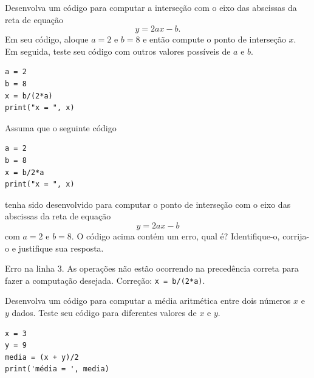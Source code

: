 \begin{exer}
  Desenvolva um código {\python} para computar a interseção com o eixo das abscissas da reta de equação
  \begin{equation}
    y =  2ax - b.
  \end{equation}
  Em seu código, aloque $a=2$ e $b=8$ e então compute o ponto de interseção $x$. Em seguida, teste seu código com outros valores possíveis de $a$ e $b$.
\end{exer}
\begin{resp}

\begin{lstlisting}
a = 2
b = 8
x = b/(2*a)
print("x = ", x)
\end{lstlisting}

\end{resp}

\begin{exer}
  Assuma que o seguinte código {\python}

\begin{lstlisting}
a = 2
b = 8
x = b/2*a
print("x = ", x)
\end{lstlisting}

tenha sido desenvolvido para computar o ponto de interseção com o eixo das abscissas da reta de equação
  \begin{equation}
    y = 2ax - b
  \end{equation}
  com $a=2$ e $b=8$. O código acima contém um erro, qual é? Identifique-o, corrija-o e justifique sua resposta.
\end{exer}
\begin{resp}
  Erro na linha 3. As operações não estão ocorrendo na precedência correta para fazer a computação desejada. Correção: \lstinline+x = b/(2*a)+.
\end{resp}

\begin{exer}
  Desenvolva um código {\python} para computar a média aritmética entre dois números $x$ e $y$ dados. Teste seu código para diferentes valores de $x$ e $y$.
\end{exer}
\begin{resp}

\begin{lstlisting}
x = 3
y = 9
media = (x + y)/2
print('média = ', media)
\end{lstlisting}

\end{resp}

